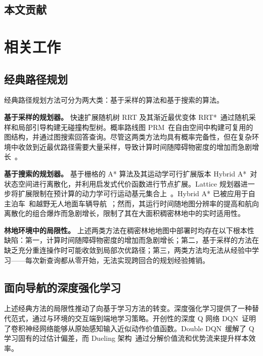 \documentclass{iopjournal}
\begin{document}
\subsection{本文贡献}


\section{相关工作}\label{sec:related}

\subsection{经典路径规划}\label{sec:related:classical}

经典路径规划方法可分为两大类：基于采样的算法和基于搜索的算法。

\textbf{基于采样的规划器。}
快速扩展随机树 RRT 及其渐近最优变体 RRT*~\cite{karaman2011sampling}通过随机采样和局部引导构建无碰撞构型树。概率路线图 PRM~\cite{kavraki1996probabilistic}在自由空间中构建可复用的图结构，并通过图搜索回答查询。尽管这两类方法均具有概率完备性，但在复杂环境中收敛到近最优路径需要大量采样，导致计算时间随障碍物密度的增加而急剧增长~\cite{yin2023efficient,jiang2022r2rrt}。

\textbf{基于搜索的规划器。}
基于栅格的 A* 算法及其运动学可行扩展版本 Hybrid A*~\cite{dolgov2010path}对状态空间进行离散化，并利用启发式代价函数进行节点扩展。Lattice 规划器进一步将扩展限制在预计算的动力学可行运动基元集合上~\cite{pivtoraiko2009differentially}。Hybrid A* 已被应用于自主泊车~\cite{lian2023trajectory}和越野无人地面车辆导航~\cite{thoresen2021path}；然而，其运行时间随地图分辨率的提高和航向离散化的组合爆炸而急剧增长，限制了其在大面积稠密林地中的实时适用性。

\textbf{林地环境中的局限性。}
上述两类方法在稠密林地地图中部署时均存在以下根本性缺陷：第一，计算时间随障碍物密度的增加而急剧增长；第二，基于采样的方法在缺乏充分重连操作时可能收敛到局部次优路径；第三，两类方法均无法从经验中学习——每次新查询都从零开始，无法实现跨回合的规划经验摊销。

\subsection{面向导航的深度强化学习}\label{sec:related:drl}

上述经典方法的局限性推动了向基于学习方法的转变。深度强化学习提供了一种替代范式，通过与环境的交互端到端地学习策略。开创性的深度 Q 网络 DQN~\cite{mnih2015human}证明了卷积神经网络能够从原始感知输入近似动作价值函数。Double DQN~\cite{van2016deep}缓解了 Q 学习固有的过估计偏差，而 Dueling 架构~\cite{wang2016dueling}通过分解价值流和优势流来提升样本效率。
\end{document}
